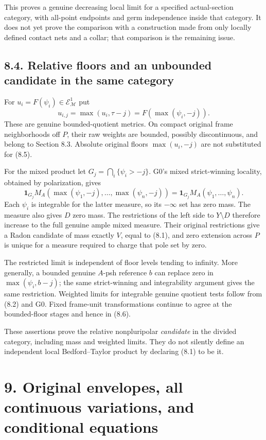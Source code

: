 \documentclass[
  10pt,
]{article}
\begin{document}
This proves a genuine decreasing local limit for a specified
actual-section category, with all-point endpoints and germ independence
inside that category. It does not yet prove the comparison with a
construction made from only locally defined contact nets and a collar;
that comparison is the remaining issue.

\subsection{8.4. Relative floors and an unbounded candidate in the same
category}\label{relative-floors-and-an-unbounded-candidate-in-the-same-category}

For \(u_i=F(\psi_i)\in\mathcal E^1_{\mathcal M}\) put
\[u_{i,j}=\max(u_i,\tau-j)=F(\max(\psi_i,-j)).             \tag{8.5}\]
These are genuine bounded-quotient metrics. On compact original frame
neighborhoods off \(P\), their raw weights are bounded, possibly
discontinuous, and belong to Section 8.3. Absolute original floors
\(\max(u_i,-j)\) are not substituted for (8.5).

For the mixed product let \(G_j=\bigcap_i\{\psi_i>-j\}\). G0's mixed
strict-winning locality, obtained by polarization, gives
\[\mathbf1_{G_j}M_A(\max(\psi_1,-j),\ldots,\max(\psi_n,-j))
=\mathbf1_{G_j}M_A(\psi_1,\ldots,\psi_n).                \tag{8.6}\]
Each \(\psi_i\) is integrable for the latter measure, so its \(-\infty\)
set has zero mass. The measure also gives \(D\) zero mass. The
restrictions of the left side to \(Y\setminus D\) therefore increase to
the full genuine ample mixed measure. Their original restrictions give a
Radon candidate of mass exactly \(V\), equal to (8.1), and zero
extension across \(P\) is unique for a measure required to charge that
pole set by zero.

The restricted limit is independent of floor levels tending to infinity.
More generally, a bounded genuine \(A\)-psh reference \(b\) can replace
zero in \(\max(\psi_i,b-j)\); the same strict-winning and integrability
argument gives the same restriction. Weighted limits for integrable
genuine quotient tests follow from (8.2) and G0. Fixed frame-unit
transformations continue to agree at the bounded-floor stages and hence
in (8.6).

These assertions prove the relative nonpluripolar \emph{candidate} in
the divided category, including mass and weighted limits. They do not
silently define an independent local Bedford--Taylor product by
declaring (8.1) to be it.

\section{9. Original envelopes, all continuous variations, and
conditional
equations}\label{original-envelopes-all-continuous-variations-and-conditional-equations}
\end{document}
